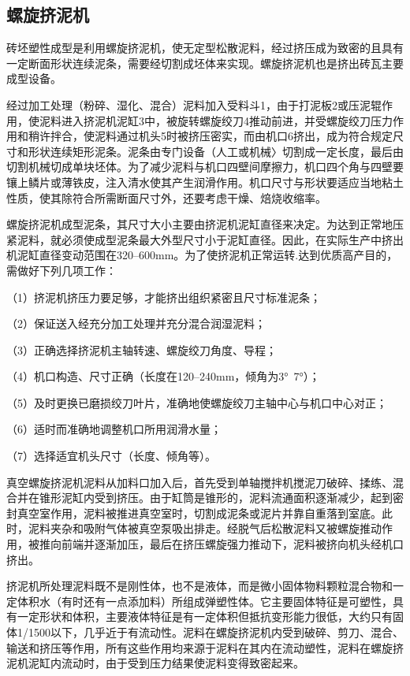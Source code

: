 \documentclass{ctexbook}
\begin{document}
\subsection{螺旋挤泥机}
砖坯塑性成型是利用螺旋挤泥机，使无定型松散泥料，经过挤压成为致密的且具有一定断面形状连续泥条，需要经切割成坯体来实现。螺旋挤泥机也是挤出砖瓦主要成型设备。

经过加工处理（粉碎、湿化、混合）泥料加入受料斗1，由于打泥板2或压泥辊作用，使泥料进入挤泥机泥缸3中，被旋转螺旋绞刀4推动前进，并受螺旋绞刀压力作用和稍许拌合，使泥料通过机头5时被挤压密实，而由机口6挤出，成为符合规定尺寸和形状连续矩形泥条。泥条由专门设备（人工或机械〉切割成一定长度，最后由切割机械切成单块坯体。为了减少泥料与机口四壁间摩擦力，机口四个角与四壁要镶上鳞片或薄铁皮，注入清水使其产生润滑作用。机口尺寸与形状要适应当地粘土性质，使其除符合所需断面尺寸外，还要考虑干燥、焙烧收缩率。

螺旋挤泥机成型泥条，其尺寸大小主要由挤泥机泥缸直径来决定。为达到正常地压紧泥料，就必须使成型泥条最大外型尺寸小于泥缸直径。因此，在实际生产中挤出机泥缸直径变动范围在320--600mm。为了使挤泥机正常运转.达到优质高产目的，需做好下列几项工作：

（1）挤泥机挤压力要足够，才能挤出组织紧密且尺寸标准泥条；

（2）保证送入经充分加工处理并充分混合润湿泥料；

（3）正确选择挤泥机主轴转速、螺旋绞刀角度、导程；

（4）机口构造、尺寸正确（长度在120--240mm，倾角为3°~7°）；

（5）及时更换已磨损绞刀叶片，准确地使螺旋绞刀主轴中心与机口中心对正；

（6）适时而准确地调整机口所用润滑水量；

（7）选择适宜机头尺寸（长度、倾角等）。

真空螺旋挤泥机泥料从加料口加入后，首先受到单轴搅拌机搅泥刀破碎、揉练、混合并在锥形泥缸内受到挤压。由于缸筒是锥形的，泥料流通面积逐渐减少，起到密封真空室作用，泥料被推进真空室时，切割成泥条或泥片并靠自重落到室底。此时，泥料夹杂和吸附气体被真空泵吸出排走。经脱气后松散泥料又被螺旋推动作用，被推向前端并逐渐加压，最后在挤压螺旋强力推动下，泥料被挤向机头经机口挤出。

挤泥机所处理泥料既不是刚性体，也不是液体，而是微小固体物料颗粒混合物和一定体积水（有时还有一点添加料）所组成弹塑性体。它主要固体特征是可塑性，具有一定形状和体积，主要液体特征是有一定体积但抵抗变形能力很低，大约只有固体1/1500以下，几乎近于有流动性。泥料在螺旋挤泥机内受到破碎、剪刀、混合、输送和挤压等作用，所有这些作用均来源于泥料在其内在流动塑性，泥料在螺旋挤泥机泥缸内流动时，由于受到压力结果使泥料变得致密起来。
\end{document}
